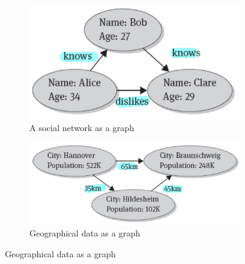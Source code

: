 \begin{figure}
     \centering
     \begin{subfigure}[b]{0.45\textwidth}
         \centering
         \includegraphics[width=\textwidth]{images/AdvancedDataManagment/graph_databases/social_network_example.jpeg}
         \caption{A social network as a graph}
     \end{subfigure}
     \hfill
     \begin{subfigure}[b]{0.45\textwidth}
         \centering
         \includegraphics[width=\textwidth]{images/AdvancedDataManagment/graph_databases/geographical_example.jpeg}
         \caption{Geographical data as a graph}
     \end{subfigure}
\end{figure}

